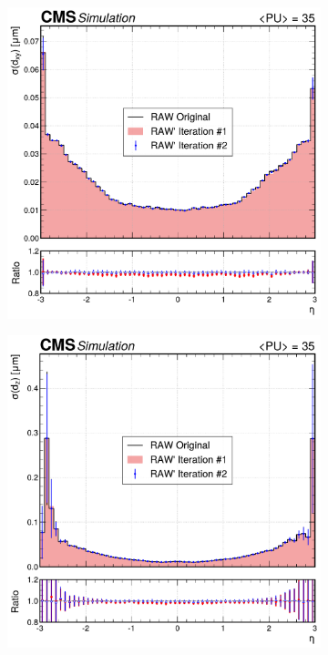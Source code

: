 \begin{figure}[h]
        \centering
        \begin{subfigure}[b]{0.49\textwidth}
            \centering
            \includegraphics[width=\textwidth]{Figures/Chapter5/resolution_comparison_dxy_eta.pdf}
            \caption{}
        \end{subfigure}
        \begin{subfigure}[b]{0.49\textwidth}
            \centering
            \includegraphics[width=\textwidth]{Figures/Chapter5/resolution_comparison_dz_eta.pdf}
            \caption{}
        \end{subfigure}
        

\end{figure}
